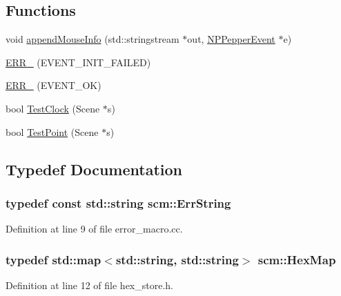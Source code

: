 \subsection*{Functions}
\begin{DoxyCompactItemize}
\item 
void \hyperlink{namespacescm_acb8f6b2f25d7c07de183bb8b8d518510}{appendMouseInfo} (std::stringstream $\ast$out, \hyperlink{struct___n_p_pepper_event}{NPPepperEvent} $\ast$e)
\item 
\hyperlink{namespacescm_adbb7998a18f4d5b55f2d9af9146e27e9}{ERR\_\-} (EVENT\_\-INIT\_\-FAILED)
\item 
\hyperlink{namespacescm_af343ae95ed75977e4da042874b9edacc}{ERR\_\-} (EVENT\_\-OK)
\item 
bool \hyperlink{namespacescm_a2f933647227de09b34772f194e579a63}{TestClock} (Scene $\ast$s)
\item 
bool \hyperlink{namespacescm_aca67b9b84fd6253da0c69b4c521e6bc6}{TestPoint} (Scene $\ast$s)
\end{DoxyCompactItemize}


\subsection{Typedef Documentation}
\hypertarget{namespacescm_a13a6ecf77ceb7b5b3a38e0fada54aa99}{
\subsubsection[{ErrString}]{\setlength{\rightskip}{0pt plus 5cm}typedef const std::string {\bf scm::ErrString}}}
\label{namespacescm_a13a6ecf77ceb7b5b3a38e0fada54aa99}


Definition at line 9 of file error\_\-macro.cc.

\hypertarget{namespacescm_a4d40b517d9d5d1165028e138a05ef06d}{
\subsubsection[{HexMap}]{\setlength{\rightskip}{0pt plus 5cm}typedef std::map$<$std::string, std::string$>$ {\bf scm::HexMap}}}
\label{namespacescm_a4d40b517d9d5d1165028e138a05ef06d}


Definition at line 12 of file hex\_\-store.h.




